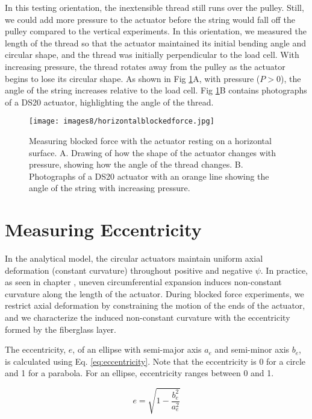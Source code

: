 In this testing orientation, the inextensible thread still runs over the pulley. Still, we could add more pressure to the actuator before the string would fall off the pulley compared to the vertical experiments. In this orientation, we measured the length of the thread so that the actuator maintained its initial bending angle and circular shape, and the thread was initially perpendicular to the load cell. With increasing pressure, the thread rotates away from the pulley as the actuator begins to lose its circular shape. As shown in Fig \ref{fig:horizontalblockedforce}A, with pressure ($P > 0$), the angle of the string increases relative to the load cell. Fig \ref{fig:horizontalblockedforce}B contains photographs of a DS20 actuator, highlighting the angle of the thread. 

\begin{figure}[ht]
    \centering
     \texttt{[image: images8/horizontalblockedforce.jpg]}
    \caption{Measuring blocked force with the actuator resting on a horizontal surface. A. Drawing of how the shape of the actuator changes with pressure, showing how the angle of the thread changes. B. Photographs of a DS20 actuator with an orange line showing the angle of the string with increasing pressure.}
    \label{fig:horizontalblockedforce}
\end{figure}

\clearpage
\section{Measuring Eccentricity}
\label{section:eccentricity}

In the analytical model, the circular actuators maintain uniform axial deformation (constant curvature) throughout positive and negative $\psi$. In practice, as seen in chapter \label{chapter:angleresults}, uneven circumferential expansion induces non-constant curvature along the length of the actuator. During blocked force experiments, we restrict axial deformation by constraining the motion of the ends of the actuator, and we characterize the induced non-constant curvature with the eccentricity formed by the fiberglass layer. 

The eccentricity, $e$, of an ellipse with semi-major axis $a_e$ and semi-minor axis $b_e$, is calculated using Eq. \ref{eq:eccentricity}. Note that the eccentricity is 0 for a circle and 1 for a parabola. For an ellipse, eccentricity ranges between 0 and 1. 

\begin{equation}
    e = \sqrt{1-\frac{b_e^2}{a_e^2}}
    \label{eq:eccentricity}
\end{equation} 

